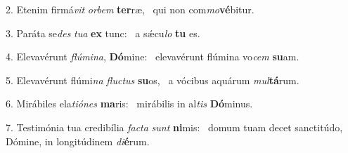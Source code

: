 2. Etenim firmá\textit{vit} \textit{or}\textit{bem} \textbf{ter}ræ, \ast\  qui non com\textit{mo}\textbf{vé}bitur.\

3. Paráta se\textit{des} \textit{tu}\textit{a} \textbf{ex} tunc: \ast\  a sǽcu\textit{lo} \textbf{tu} es.\

4. Elevavérunt \textit{flú}\textit{mi}\textit{na}, \textbf{Dó}mine: \ast\  elevavérunt flúmina vo\textit{cem} \textbf{su}am.\

5. Elevavérunt flúmi\textit{na} \textit{fluc}\textit{tus} \textbf{su}os, \ast\  a vócibus aquárum \textit{mul}\textbf{tá}rum.\

6. Mirábiles ela\textit{ti}\textit{ó}\textit{nes} \textbf{ma}ris: \ast\  mirábilis in al\textit{tis} \textbf{Dó}minus.\

7. Testimónia tua credibília \textit{fac}\textit{ta} \textit{sunt} \textbf{ni}mis: \ast\  domum tuam decet sanctitúdo, Dómine, in longitúdinem \textit{di}\textbf{é}rum.\

